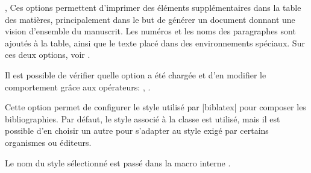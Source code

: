\begin{noprint}
\end{noprint}

,
Ces options permettent d'imprimer des éléments supplémentaires dans la table des matières, principalement dans le but de générer un document donnant une vision d'ensemble du manuscrit. Les numéros et les noms des paragraphes sont ajoutés à la table, ainsi que le texte placé dans des environnements spéciaux. Sur ces deux options, voir .

\begin{developer}
Il est possible de vérifier quelle option a été chargée et d'en modifier le comportement grâce aux opérateurs: , .
\end{developer}

\begin{noprint}
\end{noprint}

Cette option permet de configurer le style utilisé par |biblatex| pour composer les bibliographies. Par défaut, le style associé à la classe \frenchlaw est utilisé, mais il est possible d'en choisir un autre pour s'adapter au style exigé par certains organismes ou éditeurs.

\begin{developer}
Le nom du style sélectionné est passé dans la macro interne .
\end{developer}

